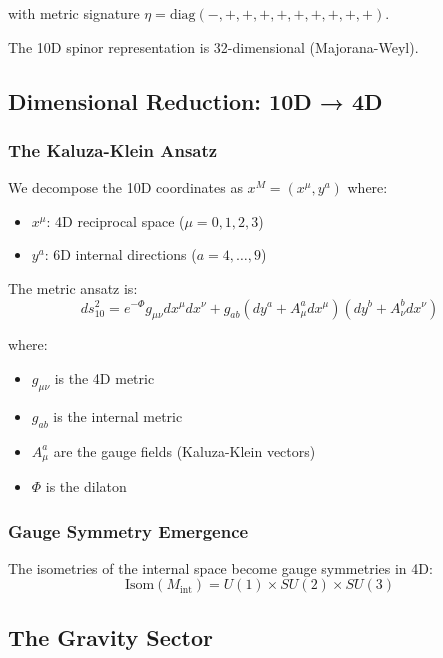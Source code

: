 with metric signature $\eta = \text{diag}(-,+,+,+,+,+,+,+,+,+)$.

The 10D spinor representation is 32-dimensional (Majorana-Weyl).

\subsection{Dimensional Reduction: 10D → 4D}

\subsubsection{The Kaluza-Klein Ansatz}

We decompose the 10D coordinates as $x^M = (x^\mu, y^a)$ where:
\begin{itemize}
    \item $x^\mu$: 4D reciprocal space ($\mu = 0,1,2,3$)
    \item $y^a$: 6D internal directions ($a = 4,\ldots,9$)
\end{itemize}

The metric ansatz is:
\begin{equation}
    ds_{10}^2 = e^{-\Phi}g_{\mu\nu}dx^\mu dx^\nu + g_{ab}(dy^a + A^a_\mu dx^\mu)(dy^b + A^b_\nu dx^\nu)
\end{equation}

where:
\begin{itemize}
    \item $g_{\mu\nu}$ is the 4D metric
    \item $g_{ab}$ is the internal metric
    \item $A^a_\mu$ are the gauge fields (Kaluza-Klein vectors)
    \item $\Phi$ is the dilaton
\end{itemize}

\subsubsection{Gauge Symmetry Emergence}

The isometries of the internal space become gauge symmetries in 4D:
\begin{equation}
    \text{Isom}(M_{\text{int}}) = U(1) \times SU(2) \times SU(3)
\end{equation}

\subsection{The Gravity Sector}

